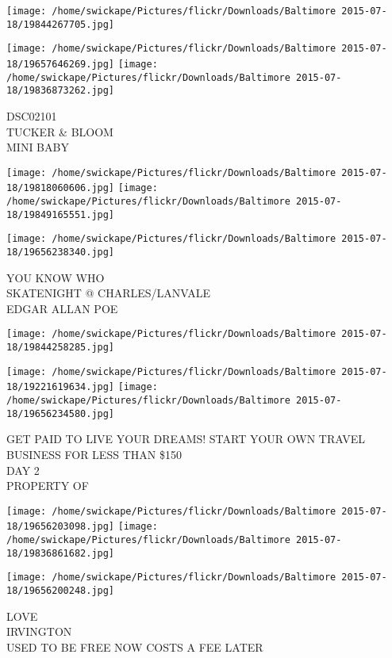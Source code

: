 \documentclass[10pt,letterpaper]{article}
\begin{document}
\texttt{[image: /home/swickape/Pictures/flickr/Downloads/Baltimore 2015-07-18/19844267705.jpg]}

\vspace{0.25in}
\texttt{[image: /home/swickape/Pictures/flickr/Downloads/Baltimore 2015-07-18/19657646269.jpg]}
\texttt{[image: /home/swickape/Pictures/flickr/Downloads/Baltimore 2015-07-18/19836873262.jpg]}

DSC02101\\
TUCKER \& BLOOM\\
MINI BABY
\pagebreak

\texttt{[image: /home/swickape/Pictures/flickr/Downloads/Baltimore 2015-07-18/19818060606.jpg]}
\texttt{[image: /home/swickape/Pictures/flickr/Downloads/Baltimore 2015-07-18/19849165551.jpg]}

\texttt{[image: /home/swickape/Pictures/flickr/Downloads/Baltimore 2015-07-18/19656238340.jpg]}

YOU KNOW WHO\\
SKATENIGHT @ CHARLES/LANVALE\\
EDGAR ALLAN POE
\pagebreak

\texttt{[image: /home/swickape/Pictures/flickr/Downloads/Baltimore 2015-07-18/19844258285.jpg]}

\vspace{0.25in}
\texttt{[image: /home/swickape/Pictures/flickr/Downloads/Baltimore 2015-07-18/19221619634.jpg]}
\texttt{[image: /home/swickape/Pictures/flickr/Downloads/Baltimore 2015-07-18/19656234580.jpg]}

GET PAID TO LIVE YOUR DREAMS!  START YOUR OWN TRAVEL BUSINESS FOR LESS THAN \$150\\
DAY 2\\
PROPERTY OF
\pagebreak

\texttt{[image: /home/swickape/Pictures/flickr/Downloads/Baltimore 2015-07-18/19656203098.jpg]}
\texttt{[image: /home/swickape/Pictures/flickr/Downloads/Baltimore 2015-07-18/19836861682.jpg]}

\vspace{0.25in}
\texttt{[image: /home/swickape/Pictures/flickr/Downloads/Baltimore 2015-07-18/19656200248.jpg]}

LOVE\\
IRVINGTON\\
USED TO BE FREE NOW COSTS A FEE LATER
\pagebreak
\end{document}
